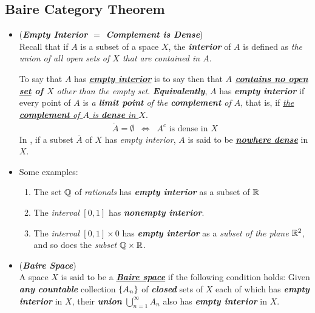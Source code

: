 \documentclass[11pt]{article}
\begin{document}
\subsection{Baire Category Theorem}
\begin{itemize}
\item \begin{remark} (\emph{\textbf{Empty Interior $=$ Complement is Dense}}) \\
Recall that if $A$ is a subset of a space $X$, the \emph{\textbf{interior}} of $A$ is defined as \emph{the union of all open sets of $X$ that are contained in $A$}. 

To say that $A$ has \underline{\emph{\textbf{empty interior}}} is to say then that \emph{\textbf{$A$ \underline{contains no open set} of $X$} other than the empty set}. \emph{\textbf{Equivalently}}, $A$ has \emph{\textbf{empty interior}} if every point of $A$ is \emph{a \textbf{limit point} of the \textbf{complement} of $A$}, that is, if \underline{\emph{the \textbf{complement} of $A$ is \textbf{dense} in $X$}}.
\begin{align*}
\mathring{A} = \emptyset \;\; \Leftrightarrow \;\; A^{c}\text{ is dense in }X
\end{align*} In \citep{reed1980methods}, if a subset $\overline{A}$ of $X$ has \emph{empty interior}, $A$ is said to be \underline{\emph{\textbf{nowhere dense}}} in $X$.
\end{remark}

\item \begin{example} 
Some  examples:
\begin{enumerate}
\item The set ${\mathbb Q}$ of \emph{rationals} has \emph{\textbf{empty interior}} as a subset of ${\mathbb R}$
\item The \emph{interval} $[0, 1]$ has \emph{\textbf{nonempty interior}}. 
\item The \emph{interval} $[0, 1] \times 0$ has \emph{\textbf{empty interior}} as a \emph{subset of the plane} ${\mathbb R}^2$, and so does the \emph{subset} ${\mathbb Q} \times {\mathbb R}$.
\end{enumerate}
\end{example}

\item \begin{definition} (\emph{\textbf{Baire Space}})\\
A space $X$ is said to be a \underline{\emph{\textbf{Baire space}}} if the following condition holds:  Given  \emph{\textbf{any countable}} collection $\left\{A_n\right\}$ of \emph{\textbf{closed}} sets of $X$ each of which has \emph{\textbf{empty interior}} in $X$, their \emph{\textbf{union}}  $\bigcup_{n=1}^{\infty} A_n$ also has \emph{\textbf{empty interior}} in $X$.
\end{definition}


\end{itemize}
\end{document}
